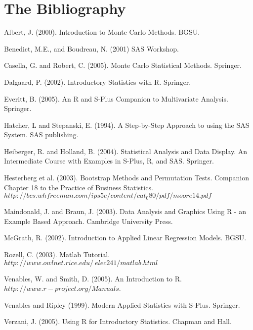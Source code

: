 \documentclass[captions=tableheading]{scrbook}
\begin{document}
\chapter{The Bibliography}
\label{sec-6}




\begin{thebibliography}{14}
Albert, J. (2000). Introduction to Monte Carlo Methods.
BGSU.

Benedict, M.E., and Boudreau, N. (2001) SAS\textregistered{}
Workshop.

Casella, G. and Robert, C. (2005). Monte Carlo Statistical
Methods. Springer.

Dalgaard, P. (2002). Introductory Statistics with R.
Springer.

Everitt, B. (2005). An R and S-Plus Companion to Multivariate
Analysis. Springer.

Hatcher, L and Stepanski, E. (1994). A Step-by-Step
Approach to using the SAS System. SAS publishing.

Heiberger, R. and Holland, B. (2004). Statistical
Analysis and Data Display. An Intermediate Course with Examples in
S-Plus, R, and SAS. Springer.

Hesterberg et al. (2003). Bootstrap Methods and Permutation
Tests. Companion Chapter 18 to the Practice of Business Statistics.
$http://bcs.whfreeman.com/ips5e/content/cat_{0}80/pdf/moore14.pdf$

Maindonald, J. and Braun, J. (2003). Data Analysis
and Graphics Using R - an Example Based Approach. Cambridge University
Press.

McGrath, R. (2002). Introduction to Applied Linear Regression Models. BGSU.

Rozell, C. (2003). Matlab Tutorial. $http://www.owlnet.rice.edu/~elec241/matlab.html$

Venables, W. and Smith, D. (2005). An Introduction
to R. $http://www.r-project.org/Manuals$.

Venables and Ripley (1999). Modern Applied Statistics
with S-Plus. Springer.

Verzani, J. (2005). Using R for Introductory Statistics.
Chapman and Hall. 
\end{thebibliography}
\end{document}
